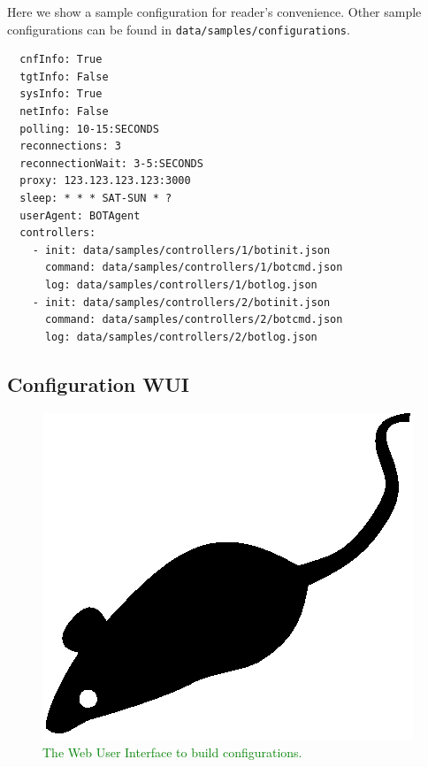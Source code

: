 Here we show a sample configuration for reader's convenience. Other sample configurations can be found in \texttt{data/samples/configurations}.

\begin{verbatim}
  cnfInfo: True
  tgtInfo: False
  sysInfo: True
  netInfo: False
  polling: 10-15:SECONDS
  reconnections: 3
  reconnectionWait: 3-5:SECONDS
  proxy: 123.123.123.123:3000
  sleep: * * * SAT-SUN * ?
  userAgent: BOTAgent
  controllers:
    - init: data/samples/controllers/1/botinit.json
      command: data/samples/controllers/1/botcmd.json
      log: data/samples/controllers/1/botlog.json
    - init: data/samples/controllers/2/botinit.json
      command: data/samples/controllers/2/botcmd.json
      log: data/samples/controllers/2/botlog.json
\end{verbatim}

\subsection{Configuration WUI}
\label{sec:configuration-wui}

\textcolor{green}{\lipsum[1]}

\begin{figure}[tp]
  \centering
  \includegraphics{./fig/acmlarge-mouse}
  \caption{\textcolor{green}{The Web User Interface to build configurations.}}
    \label{fig:configuration-wui}
\end{figure}

\textcolor{green}{\lipsum[1]}
